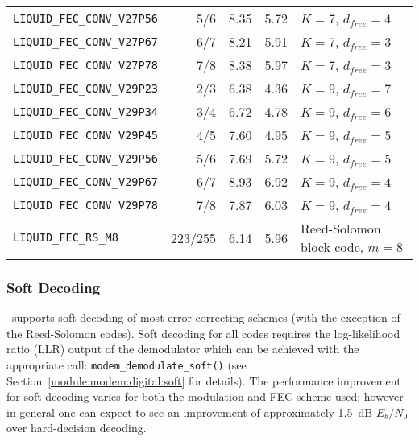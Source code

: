 \begin{table*}
{\begin{tabular*}{0.95\textwidth}{l@{\extracolsep{\fill}}rrrl}
{\tt LIQUID\_FEC\_CONV\_V27P56} & 5/6     &  8.35 & 5.72 & $K=7$, $d_{free}=4$\\
{\tt LIQUID\_FEC\_CONV\_V27P67} & 6/7     &  8.21 & 5.91 & $K=7$, $d_{free}=3$\\
{\tt LIQUID\_FEC\_CONV\_V27P78} & 7/8     &  8.38 & 5.97 & $K=7$, $d_{free}=3$\\\midrule
%
{\tt LIQUID\_FEC\_CONV\_V29P23} & 2/3     &  6.38 & 4.36 & $K=9$, $d_{free}=7$\\
{\tt LIQUID\_FEC\_CONV\_V29P34} & 3/4     &  6.72 & 4.78 & $K=9$, $d_{free}=6$\\
{\tt LIQUID\_FEC\_CONV\_V29P45} & 4/5     &  7.60 & 4.95 & $K=9$, $d_{free}=5$\\
{\tt LIQUID\_FEC\_CONV\_V29P56} & 5/6     &  7.69 & 5.72 & $K=9$, $d_{free}=5$\\
{\tt LIQUID\_FEC\_CONV\_V29P67} & 6/7     &  8.93 & 6.92 & $K=9$, $d_{free}=4$\\
{\tt LIQUID\_FEC\_CONV\_V29P78} & 7/8     &  7.87 & 6.03 & $K=9$, $d_{free}=4$\\\midrule
% 
{\tt LIQUID\_FEC\_RS\_M8}       & 223/255 &  6.14 & 5.96 & Reed-Solomon block code, $m=8$\\\bottomrule


\end{tabular*}
}
\end{table*}%

\subsubsection{Soft Decoding}
\label{module:fec:soft}
\liquid\ supports soft decoding of most error-correcting schemes
(with the exception of the Reed-Solomon codes).
Soft decoding for all codes requires the log-likelihood ratio (LLR)
output of the demodulator which can be achieved with the appropriate
call: {\tt modem\_demodulate\_soft()}
(see Section~\ref{module:modem:digital:soft} for details).
The performance improvement for soft decoding varies for both the
modulation and FEC scheme used;
however in general one can expect to see an improvement of approximately
1.5~dB $E_b/N_0$ over hard-decision decoding.


